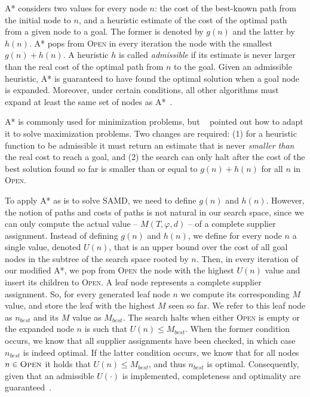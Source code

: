\documentclass[letterpaper]{article}
\newcommand{\samd}{\ac{SAMD}\xspace}
\newcommand{\astar}{\textsc{A*}\xspace}
\newcommand{\open}{\textsc{Open}\xspace}
\begin{document}
\astar considers two values for every node $n$:
the cost of the best-known path from the initial node to $n$,
and a heuristic estimate of the cost of the optimal path from a given node to a goal.
The former is denoted by $g(n)$ and the latter by $h(n)$. \astar pops from \open in every iteration the
node with the smallest $g(n)+h(n)$.
A heuristic $h$ is called \emph{admissible} if its estimate is never larger than the real cost of the optimal path from $n$ to the goal.
Given an admissible heuristic, \astar is guaranteed to have found the optimal solution when a goal node is expanded. Moreover, under certain conditions, all other algorithms must expand at least the same set of nodes as \astar~\cite{dechter1985generalized,holte2019OnThe}.


\astar is commonly used for minimization problems, but ~\cite{stern2014max} pointed out how to adapt it to solve maximization problems. Two changes are required: (1) for a heuristic function to be admissible it must return an estimate that is never \emph{smaller than} the real cost to reach a goal,
and (2) the search can only halt after the cost of the best solution found so far
is smaller than or equal to $g(n)+h(n)$ for all $n$ in \open.

To apply \astar as is to solve \samd, we need to define $g(n)$ and $h(n)$. However,
the notion of paths and costs of paths is not natural in our search space,
since we can only compute the actual value -- $M(T, \varphi,d)$ -- of a complete supplier assignment.
Instead of defining $g(n)$ and $h(n)$, we define for every node $n$ a single value, denoted $U(n)$,
that is an upper bound over the cost of all goal nodes in the subtree of the search space rooted by $n$.
Then, in every iteration of our modified \astar, we pop from \open the node with the highest $U(n)$ value
and insert its children to \open.
A leaf node represents a complete supplier assignment. So, for every generated leaf node $n$ we compute its corresponding $M$ value, and store the leaf with the highest $M$ seen so far. We refer to this leaf node as $n_{best}$ and its $M$ value as $M_{best}$.  The search halts when either \open is empty or the expanded node $n$ is such that $U(n)\leq M_{best}$. When the former condition occurs, we know that all supplier assignments have been checked, in which case $n_{best}$ is indeed optimal. If the latter condition occurs, we know that for all nodes $n\in \open$ it holds that $U(n)\leq M_{best}$, and thus $n_{best}$ is optimal. Consequently, given that an admissible $U(\cdot)$ is implemented, completeness and optimality are guaranteed~\cite{stern2014max,holte2019OnThe}.
\end{document}

